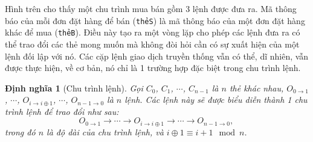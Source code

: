 \documentclass{article}
\makeatletter
\newtheorem{definition}{Định nghĩa}[section]
\newenvironment{figurehere}
 {\def\@captype{figure}}
 {}
\makeatother
\begin{document}
\begin{multicols}{2}
\begin{center}
\begin{figurehere}

\caption{Một chu trình trao đổi của 3 lệnh khác nhau}
\label{fig:ring}
\end{figurehere}
\end{center}


Hình trên cho thấy một chu trình mua bán gồm 3 lệnh được đưa ra. Mã thông báo của mỗi đơn đặt hàng để bán (\verb|thẻS|) là mã thông báo của một đơn đặt hàng khác để mua (\verb|thẻB|). Điều này tạo ra một vòng lặp cho phép các lệnh đưa ra có thể trao đổi các thẻ mong muốn mà không đòi hỏi cần có sự xuất hiện của một lệnh đối lập với nó. Các cặp lệnh giao dịch truyền thống vẫn có thể, dĩ nhiên, vẫn được thực hiện, về cơ bản, nó chỉ là 1 trường hợp đặc biệt trong chu trình lệnh. 

\begin{definition}[Chu trình lệnh] Gọi $C_{0}$, $C_{1}$, $\cdots$, $C_{n-1}$ là $n$ thẻ khác nhau, $O_{0\rightarrow 1}$, $\cdots$, $O_{i\rightarrow i\oplus 1}$, $\cdots$, $O_{n-1 \rightarrow 0}$ là $n$ lệnh. Các lệnh này sẽ được biểu diễn thành 1 chu trình lệnh để trao đổi như sau:
$$O_{0\rightarrow 1} \rightarrow \cdots \rightarrow O_{i\rightarrow i\oplus 1} \rightarrow \cdots \rightarrow O_{n-1\rightarrow 0} \text{, }$$
trong đó $n$ là độ dài của chu trình lệnh, và $i\oplus 1 \equiv i+1 \mod n$.
\end{definition}


\end{multicols}
\end{document}
